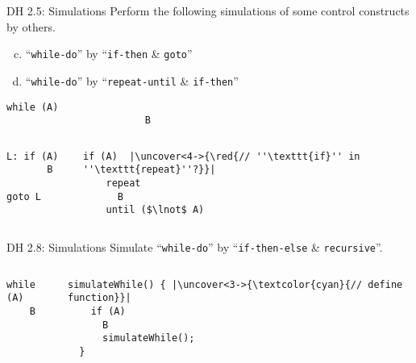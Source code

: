 \begin{frame}[fragile]{}
  \begin{exampleblock}{DH 2.5: Simulations}
    Perform the following simulations of some control constructs by others.
    \begin{enumerate}[(a)]
      \setcounter{enumi}{(2)}
      \item ``\texttt{while-do}'' by ``\texttt{if-then} \& \texttt{goto}''
      \item ``\texttt{while-do}'' by ``\texttt{repeat-until} \& \texttt{if-then}''
    \end{enumerate}
  \end{exampleblock}

  \begin{lstlisting}[style = Cstyle, backgroundcolor = \color{teal!10!lightgray}]
                      while (A)
                        B
  \end{lstlisting}

  \begin{columns}
      \pause
      \begin{lstlisting}[style = Cstyle]
  L: if (A)
       B
       goto L
      \end{lstlisting}
      \pause
      \begin{lstlisting}[style = Cstyle]
  if (A)  |\uncover<4->{\red{// ''\texttt{if}'' in ''\texttt{repeat}''?}}|
    repeat
      B
    until ($\lnot$ A)
      \end{lstlisting}
  \end{columns}
\end{frame}

\begin{frame}[fragile]{}
  \begin{exampleblock}{DH 2.8: Simulations}
    Simulate ``\texttt{while-do}'' by ``\texttt{if-then-else} \& \texttt{recursive}''.
  \end{exampleblock}

  \begin{columns}
      \begin{lstlisting}[style = Cstyle, backgroundcolor = \color{teal!10!lightgray}]
  while (A)
    B
      \end{lstlisting}
      \pause
      \begin{lstlisting}[style = Cstyle]
  simulateWhile() { |\uncover<3->{\textcolor{cyan}{// define function}}|
    if (A)
      B
      simulateWhile();
  }
      \end{lstlisting}
  \end{columns}
\end{frame}

